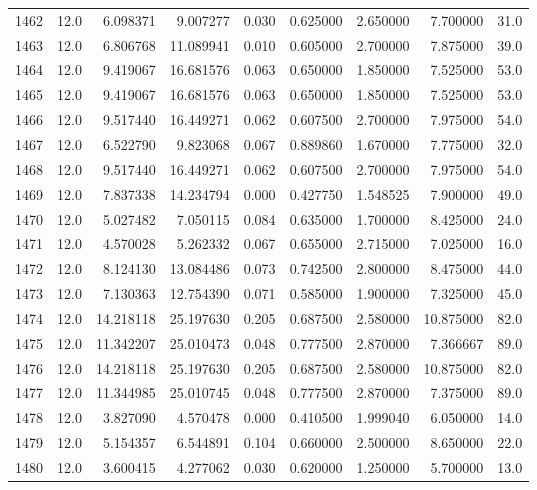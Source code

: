 \begin{tabular}{lrrrrrrrr}
1462 &   12.0 &   6.098371 &   9.007277 &  0.030 &  0.625000 &  2.650000 &   7.700000 &   31.0 \\
1463 &   12.0 &   6.806768 &  11.089941 &  0.010 &  0.605000 &  2.700000 &   7.875000 &   39.0 \\
1464 &   12.0 &   9.419067 &  16.681576 &  0.063 &  0.650000 &  1.850000 &   7.525000 &   53.0 \\
1465 &   12.0 &   9.419067 &  16.681576 &  0.063 &  0.650000 &  1.850000 &   7.525000 &   53.0 \\
1466 &   12.0 &   9.517440 &  16.449271 &  0.062 &  0.607500 &  2.700000 &   7.975000 &   54.0 \\
1467 &   12.0 &   6.522790 &   9.823068 &  0.067 &  0.889860 &  1.670000 &   7.775000 &   32.0 \\
1468 &   12.0 &   9.517440 &  16.449271 &  0.062 &  0.607500 &  2.700000 &   7.975000 &   54.0 \\
1469 &   12.0 &   7.837338 &  14.234794 &  0.000 &  0.427750 &  1.548525 &   7.900000 &   49.0 \\
1470 &   12.0 &   5.027482 &   7.050115 &  0.084 &  0.635000 &  1.700000 &   8.425000 &   24.0 \\
1471 &   12.0 &   4.570028 &   5.262332 &  0.067 &  0.655000 &  2.715000 &   7.025000 &   16.0 \\
1472 &   12.0 &   8.124130 &  13.084486 &  0.073 &  0.742500 &  2.800000 &   8.475000 &   44.0 \\
1473 &   12.0 &   7.130363 &  12.754390 &  0.071 &  0.585000 &  1.900000 &   7.325000 &   45.0 \\
1474 &   12.0 &  14.218118 &  25.197630 &  0.205 &  0.687500 &  2.580000 &  10.875000 &   82.0 \\
1475 &   12.0 &  11.342207 &  25.010473 &  0.048 &  0.777500 &  2.870000 &   7.366667 &   89.0 \\
1476 &   12.0 &  14.218118 &  25.197630 &  0.205 &  0.687500 &  2.580000 &  10.875000 &   82.0 \\
1477 &   12.0 &  11.344985 &  25.010745 &  0.048 &  0.777500 &  2.870000 &   7.375000 &   89.0 \\
1478 &   12.0 &   3.827090 &   4.570478 &  0.000 &  0.410500 &  1.999040 &   6.050000 &   14.0 \\
1479 &   12.0 &   5.154357 &   6.544891 &  0.104 &  0.660000 &  2.500000 &   8.650000 &   22.0 \\
1480 &   12.0 &   3.600415 &   4.277062 &  0.030 &  0.620000 &  1.250000 &   5.700000 &   13.0 \\

\end{tabular}
